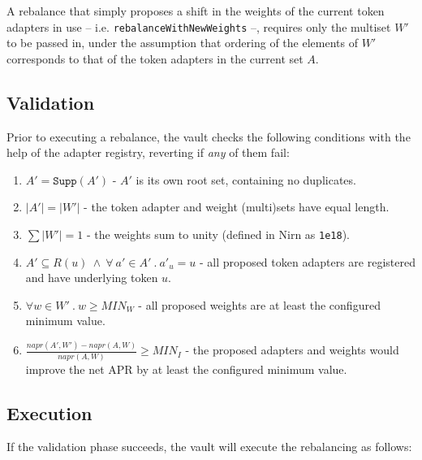 \documentclass{article}
\begin{document}
\noindent
A rebalance that simply proposes a shift in the weights of the current token adapters in use -- i.e. \texttt{rebalanceWithNewWeights} --, requires only the multiset $W'$ to be passed in, under the assumption that ordering of the elements of $W'$ corresponds to that of the token adapters in the current set $A$.

\subsection{Validation}

Prior to executing a rebalance, the vault checks the following conditions with the help of the adapter registry, reverting if \textit{any} of them fail:

\begin{enumerate}
    \item $A' =  \texttt{Supp}(A')$ - $A'$ is its own root set, containing no duplicates.
    
    \item $|A'| = |W'|$ - the token adapter and weight (multi)sets have equal length.
    
    \item $\sum |W'| = 1$ - the weights sum to unity (defined in Nirn as \texttt{1e18}).
    
    \item $A' \subseteq R(u)~\wedge~\forall~a' \in A'~.~a'_u = u$ - all proposed token adapters are registered and have underlying token $u$.
    
    \item $\forall w \in W'~.~w \geq MIN_W$ - all proposed weights are at least the configured minimum value.
    
    \item $\frac{napr(A', W') - napr(A, W)}{napr(A, W)} \geq MIN_I$ - the proposed adapters and weights would improve the net APR by at least the configured minimum value.
\end{enumerate}

\subsection{Execution}

If the validation phase succeeds, the vault will execute the rebalancing as follows:
\end{document}
